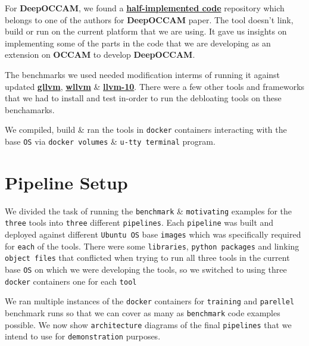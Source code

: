 \documentclass{relatorio}
\begin{document}
For \textbf{DeepOCCAM}, we found a \textbf{\href{https://github.com/nhamlv-55/OCCAM/tree/mlpolicy}{half-implemented code}} repository which belongs to one of the authors for \textbf{DeepOCCAM} paper. The tool doesn't link, build or run on the current platform that we are using. It gave us insights on implementing some of the parts in the code that we are developing as an extension on \textbf{OCCAM} to develop \textbf{DeepOCCAM}.

The benchmarks we used needed modification interms of running it against updated \textbf{\href{https://github.com/SRI-CSL/gllvm}{gllvm}}, \textbf{\href{https://github.com/SRI-CSL/whole-program-llvm}{wllvm}} \& \textbf{\href{https://github.com/lahiri-phdworks/llvm-project/tree/release/10.x}{llvm-10}}. There were a few other tools and frameworks that we had to install and test in-order to run the debloating tools on these benchamarks. 

We compiled, build \& ran the tools in \texttt{docker} containers interacting with the base \texttt{OS} via \texttt{docker volumes} \& \texttt{u-tty terminal} program.

\section{Pipeline Setup}%
\label{Tools}

We divided the task of running the \texttt{benchmark} \& \texttt{motivating} examples for the \texttt{three} tools into \texttt{three} different \texttt{pipelines}. Each \texttt{pipeline} was built and deployed against different \texttt{Ubuntu OS} base \texttt{images} which was specifically required for \texttt{each} of the tools. There were some \texttt{libraries}, \texttt{python packages} and linking \texttt{object files} that conflicted when trying to run all three tools in the current base \texttt{OS} on which we were developing the tools, so we switched to using three \texttt{docker} containers one for each \texttt{tool} 

We ran multiple instances of the \texttt{docker} containers for \texttt{training} and \texttt{parellel} benchmark runs so that we can cover as many as \texttt{benchmark} code examples possible. We now show \texttt{architecture} diagrams of the final \texttt{pipelines} that we intend to use for \texttt{demonstration} purposes. 
\end{document}

